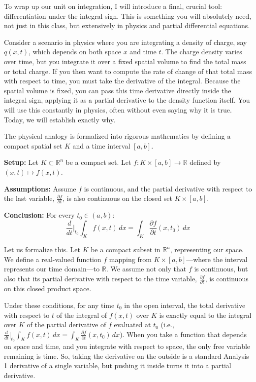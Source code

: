 \begin{spoken-clean}[32:56 - 37:37]
To wrap up our unit on integration, I will introduce a final, crucial tool: differentiation under the integral sign. This is something you will absolutely need, not just in this class, but extensively in physics and partial differential equations. 

Consider a scenario in physics where you are integrating a density of charge, say $q(x,t)$, which depends on both space $x$ and time $t$. The charge density varies over time, but you integrate it over a fixed spatial volume to find the total mass or total charge. If you then want to compute the rate of change of that total mass with respect to time, you must take the derivative of the integral. Because the spatial volume is fixed, you can pass this time derivative directly inside the integral sign, applying it as a partial derivative to the density function itself. You will use this constantly in physics, often without even saying why it is true. Today, we will establish exactly why.
\end{spoken-clean}

\begin{math-stroke}
The physical analogy is formalized into rigorous mathematics by defining a compact spatial set $K$ and a time interval $[a,b]$.

\textbf{Setup:}
Let $K \subset \mathbb{R}^n$ be a compact set. Let $f: K \times [a,b] \to \mathbb{R}$ defined by $(x,t) \mapsto f(x,t)$.

\textbf{Assumptions:}
Assume $f$ is continuous, and the partial derivative with respect to the last variable, $\frac{\partial f}{\partial t}$, is also continuous on the closed set $K \times [a,b]$.

\textbf{Conclusion:}
For every $t_0 \in (a,b)$:
\[
\frac{d}{dt} \bigg|_{t_0} \int_K f(x,t) \, dx = \int_K \frac{\partial f}{\partial t}(x,t_0) \, dx
\]
\end{math-stroke}

\begin{spoken-clean}[37:40 - 41:03]
Let us formalize this. Let $K$ be a compact subset in $\mathbb{R}^n$, representing our space. We define a real-valued function $f$ mapping from $K \times [a,b]$—where the interval represents our time domain—to $\mathbb{R}$. We assume not only that $f$ is continuous, but also that its partial derivative with respect to the time variable, $\frac{\partial f}{\partial t}$, is continuous on this closed product space. 

Under these conditions, for any time $t_0$ in the open interval, the total derivative with respect to $t$ of the integral of $f(x,t)$ over $K$ is exactly equal to the integral over $K$ of the partial derivative of $f$ evaluated at $t_0$ (i.e., $\frac{d}{dt} \big|_{t_0} \int_K f(x,t) \, dx = \int_K \frac{\partial f}{\partial t}(x,t_0) \, dx$). When you take a function that depends on space and time, and you integrate with respect to space, the only free variable remaining is time. So, taking the derivative on the outside is a standard Analysis 1 derivative of a single variable, but pushing it inside turns it into a partial derivative.
\end{spoken-clean}


